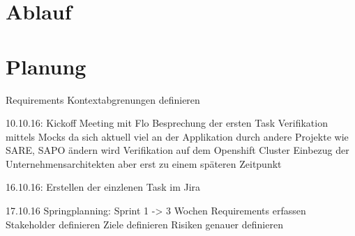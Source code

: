 \section{Ablauf}

\section{Planung}

Requirements Kontextabgrenungen definieren



10.10.16:
Kickoff Meeting mit Flo
Besprechung der ersten Task
Verifikation mittels Mocks da sich aktuell viel an der Applikation durch andere Projekte wie SARE, SAPO ändern wird
Verifikation auf dem Openshift Cluster
Einbezug der Unternehmensarchitekten aber erst zu einem späteren Zeitpunkt

16.10.16:
Erstellen der einzlenen Task im Jira

17.10.16
Springplanning:
Sprint 1 -> 3 Wochen
Requirements erfassen
Stakeholder definieren
Ziele definieren
Risiken genauer definieren
 